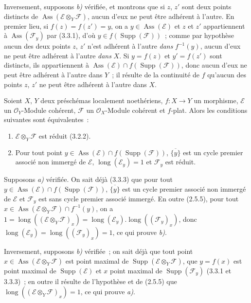 Inversement, supposons \emph{b)} vérifiée, et montrons que si $z$, $z'$ sont
deux points distincts de $\operatorname{Ass}(\mathcal E\otimes_Y\mathcal F)$,
aucun d'eux ne peut être adhérent à l'autre. En premier lieu, si
$f(z)=f(z')=y$, on a $y\in\operatorname{Ass}(\mathcal E)$ et $z$ et $z'$
appartiennent à $\operatorname{Ass}(\mathcal F_y)$ par (3.3.1), d'où
$y\in f(\operatorname{Supp}(\mathcal F))$~; comme par hypothèse aucun des deux
points $z$, $z'$ n'est adhérent à l'autre \emph{dans} $f^{-1}(y)$, aucun d'eux
ne peut être adhérent à l'autre \emph{dans} $X$. Si $y=f(z)$ et $y'=f(z')$ sont
distincts, ils appartiennent à
$\operatorname{Ass}(\mathcal E)\cap f(\operatorname{Supp}(\mathcal F))$, donc
aucun d'eux ne peut être adhérent à l'autre dans $Y$~; il résulte de la
continuité de $f$ qu'aucun des points $z$, $z'$ ne peut être adhérent à
l'autre dans $X$.

\begin{proposition}[3.3.4]
\label{IV.2.3.3.4-fr}
Soient $X$, $Y$ deux préschémas localement noethériens, $f:X\to Y$ un
morphisme, $\mathcal E$ un $\mathcal O_Y$-Module cohérent, $\mathcal F$ un
$\mathcal O_X$-Module cohérent et $f$-plat. Alors les conditions suivantes
sont équivalentes~:
\begin{enumerate}
\item[\emph{a)}] $\mathcal E\otimes_Y\mathcal F$ est réduit \textup{(3.2.2)}.
\item[\emph{b)}] Pour tout point
$y\in\operatorname{Ass}(\mathcal E)\cap f(\operatorname{Supp}(\mathcal F))$,
$\overline{\{y\}}$ est un cycle premier associé non immergé de $\mathcal E$,
$\operatorname{long}(\mathcal E_y)=1$ et $\mathcal F_y$ est réduit.
\end{enumerate}
\end{proposition}

Supposons \emph{a)} vérifiée. On sait déjà (3.3.3) que pour tout
$y\in\operatorname{Ass}(\mathcal E)\cap f(\operatorname{Supp}(\mathcal F))$,
$\overline{\{y\}}$ est un cycle premier associé non immergé de $\mathcal E$ et
$\mathcal F_y$ est sans cycle premier associé immergé. En outre (2.5.5), pour
tout $x\in\operatorname{Ass}(\mathcal E\otimes_Y\mathcal F)\cap f^{-1}(y)$,
on a
$1=\operatorname{long}((\mathcal E\otimes_Y\mathcal F)_x)
=\operatorname{long}(\mathcal E_y).\operatorname{long}((\mathcal F_y)_x)$,
donc $\operatorname{long}(\mathcal E_y)
=\operatorname{long}((\mathcal F_y)_x)=1$, ce qui prouve \emph{b)}.

Inversement, supposons \emph{b)} vérifiée~; on sait déjà que tout point
$x\in\operatorname{Ass}(\mathcal E\otimes_Y\mathcal F)$ est point maximal de
$\operatorname{Supp}(\mathcal E\otimes_Y\mathcal F)$, que $y=f(x)$ est point
maximal de $\operatorname{Supp}(\mathcal E)$ et $x$ point maximal de
$\operatorname{Supp}(\mathcal F_y)$ (3.3.1 et 3.3.3)~; en outre il résulte de
l'hypothèse et de (2.5.5) que
$\operatorname{long}((\mathcal E\otimes_Y\mathcal F)_x)=1$, ce qui prouve
\emph{a)}.

